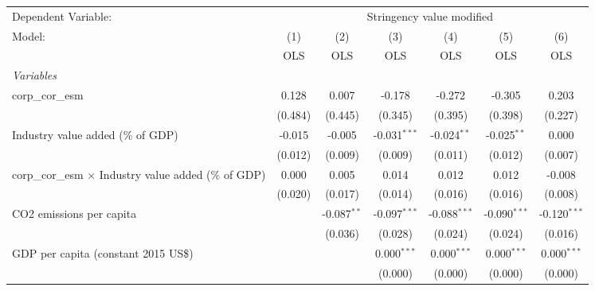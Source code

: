 
\begingroup
\centering
\begin{tabular}{lcccccc}
   \toprule
   Dependent Variable: & \multicolumn{6}{c}{Stringency value modified}\\
   Model:                                                       & (1)     & (2)           & (3)            & (4)            & (5)            & (6)\\  
                                                                &  OLS    & OLS           & OLS            & OLS            & OLS            & OLS\\  
   \midrule
   \emph{Variables}\\
   corp\_cor\_esm                                               & 0.128   & 0.007         & -0.178         & -0.272         & -0.305         & 0.203\\   
                                                                & (0.484) & (0.445)       & (0.345)        & (0.395)        & (0.398)        & (0.227)\\   
   Industry value added (\% of GDP)                             & -0.015  & -0.005        & -0.031$^{***}$ & -0.024$^{**}$  & -0.025$^{**}$  & 0.000\\   
                                                                & (0.012) & (0.009)       & (0.009)        & (0.011)        & (0.012)        & (0.007)\\   
   corp\_cor\_esm $\times$ Industry value added (\% of GDP)     & 0.000   & 0.005         & 0.014          & 0.012          & 0.012          & -0.008\\   
                                                                & (0.020) & (0.017)       & (0.014)        & (0.016)        & (0.016)        & (0.008)\\   
   CO2 emissions per capita                                     &         & -0.087$^{**}$ & -0.097$^{***}$ & -0.088$^{***}$ & -0.090$^{***}$ & -0.120$^{***}$\\   
                                                                &         & (0.036)       & (0.028)        & (0.024)        & (0.024)        & (0.016)\\   
   GDP per capita (constant 2015 US\$)                          &         &               & 0.000$^{***}$  & 0.000$^{***}$  & 0.000$^{***}$  & 0.000$^{***}$\\   
                                                                &         &               & (0.000)        & (0.000)        & (0.000)        & (0.000)\\   

\end{tabular}
